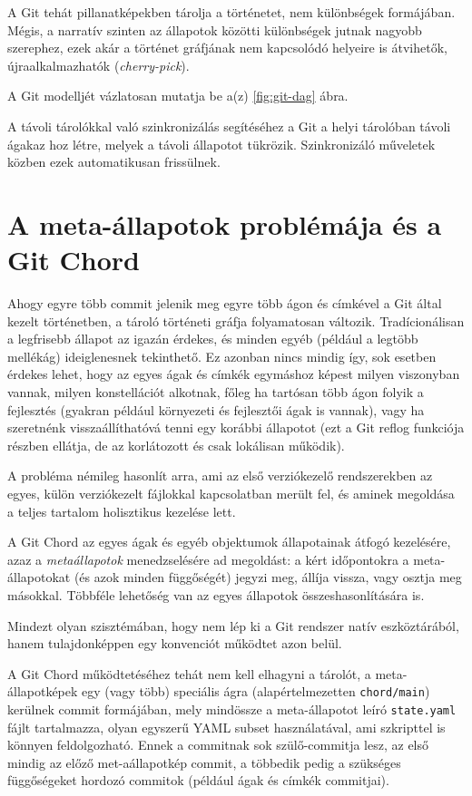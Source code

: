 \documentclass[
]{elteikthesis}[2025/03/25]
\begin{document}
A Git tehát pillanatképekben tárolja a történetet, nem különbségek formájában.
Mégis, a narratív szinten az állapotok közötti különbségek jutnak nagyobb szerephez,
ezek akár a történet gráfjának nem kapcsolódó helyeire is átvihetők, újraalkalmazhatók
(\textit{cherry-pick}).

A Git modelljét vázlatosan mutatja be a(z) \ref{fig:git-dag} ábra.

A távoli tárolókkal való szinkronizálás segítéséhez a Git a helyi tárolóban
távoli ágakaz hoz létre, melyek a távoli állapotot tükrözik.
Szinkronizáló műveletek közben ezek automatikusan frissülnek.

\section{A meta-állapotok problémája és a Git Chord}

Ahogy egyre több commit jelenik meg egyre több ágon és címkével a Git által kezelt történetben,
a tároló történeti gráfja folyamatosan változik.
Tradícionálisan a legfrisebb állapot az igazán érdekes,
és minden egyéb (például a legtöbb mellékág) ideiglenesnek tekinthető.
Ez azonban nincs mindig így,
sok esetben érdekes lehet, hogy az egyes ágak és címkék egymáshoz képest milyen viszonyban vannak,
milyen konstellációt alkotnak,
főleg ha tartósan több ágon folyik a fejlesztés (gyakran például környezeti és fejlesztői ágak is vannak),
vagy ha szeretnénk visszaállíthatóvá tenni egy korábbi állapotot
(ezt a Git reflog funkciója részben ellátja, de az korlátozott és csak lokálisan működik).

A probléma némileg hasonlít arra, ami az első verziókezelő rendszerekben
az egyes, külön verziókezelt fájlokkal kapcsolatban merült fel,
és aminek megoldása a teljes tartalom holisztikus kezelése lett.

A Git Chord az egyes ágak és egyéb objektumok állapotainak átfogó kezelésére,
azaz a \textit{metaállapotok} menedzselésére ad megoldást:
a kért időpontokra a meta-állapotokat (és azok minden függőségét) jegyzi meg, állíja vissza, vagy osztja meg másokkal.
Többféle lehetőség van az egyes állapotok összeshasonlítására is.

Mindezt olyan szisztémában, hogy nem lép ki a Git rendszer natív eszköztárából,
hanem tulajdonképpen egy konvenciót működtet azon belül.

A Git Chord működtetéséhez tehát nem kell elhagyni a tárolót,
a meta-állapotképek egy (vagy több) speciális ágra (alapértelmezetten \verb|chord/main|) kerülnek commit formájában,
mely mindössze a meta-állapotot leíró \verb|state.yaml| fájlt tartalmazza,
olyan egyszerű YAML subset használatával, ami szkripttel is könnyen feldolgozható.
Ennek a commitnak sok szülő-commitja lesz, az első mindig az előző met-aállapotkép commit,
a többedik pedig a szükséges függőségeket hordozó commitok (például ágak és címkék commitjai).
\end{document}
